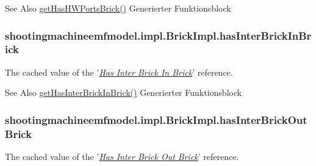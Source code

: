 \begin{DoxySeeAlso}{See Also}
\hyperlink{classshootingmachineemfmodel_1_1impl_1_1_brick_impl_aab300b09314059764d15304583bebebb}{get\-Has\-H\-W\-Ports\-Brick()} Generierter Funktionsblock  
\end{DoxySeeAlso}
\hypertarget{classshootingmachineemfmodel_1_1impl_1_1_brick_impl_ad37bf6ab0aa3031e9a4d46abb9aa3329}{
\subsubsection[{has\-Inter\-Brick\-In\-Brick}]{ shootingmachineemfmodel.\-impl.\-Brick\-Impl.\-has\-Inter\-Brick\-In\-Brick\hspace{0.3cm}{\ttfamily [protected]}}}\label{classshootingmachineemfmodel_1_1impl_1_1_brick_impl_ad37bf6ab0aa3031e9a4d46abb9aa3329}
The cached value of the '\hyperlink{classshootingmachineemfmodel_1_1impl_1_1_brick_impl_a5fe98ab17b520113cdf2ac590a74472a}{{\itshape Has Inter Brick In Brick}}' reference.

\begin{DoxySeeAlso}{See Also}
\hyperlink{classshootingmachineemfmodel_1_1impl_1_1_brick_impl_a5fe98ab17b520113cdf2ac590a74472a}{get\-Has\-Inter\-Brick\-In\-Brick()} Generierter Funktionsblock  
\end{DoxySeeAlso}
\hypertarget{classshootingmachineemfmodel_1_1impl_1_1_brick_impl_a6840d2c02a6b95ce3f4c10093a40441d}{
\subsubsection[{has\-Inter\-Brick\-Out\-Brick}]{ shootingmachineemfmodel.\-impl.\-Brick\-Impl.\-has\-Inter\-Brick\-Out\-Brick\hspace{0.3cm}{\ttfamily [protected]}}}\label{classshootingmachineemfmodel_1_1impl_1_1_brick_impl_a6840d2c02a6b95ce3f4c10093a40441d}
The cached value of the '\hyperlink{classshootingmachineemfmodel_1_1impl_1_1_brick_impl_ac5c3b5d60e475bbfdeaae00ca253a7bf}{{\itshape Has Inter Brick Out Brick}}' reference.

